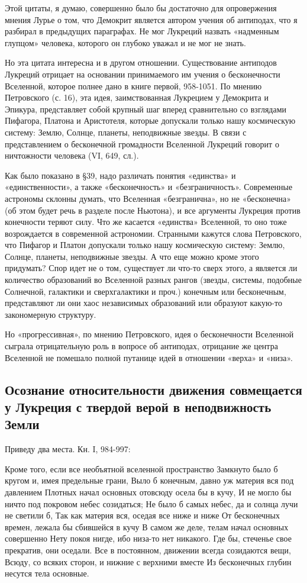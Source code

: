 Этой цитаты, я думаю, совершенно было бы достаточно для опровержения
мнения Лурье о том, что Демокрит является автором учения об антиподах,
что я разбирал в предыдущих параграфах. Не мог Лукреций назвать
«надменным глупцом» человека, которого он глубоко уважал и не мог не
знать.

Но эта цитата интересна и в другом отношении. Существование антиподов
Лукреций отрицает на основании принимаемого им учения о бесконечности
Вселенной, которое полнее дано в книге первой, 958-1051. По мнению
Петровского (с. 16), эта идея, заимствованная Лукрецием у Демокрита и
Эпикура, представляет собой крупный шаг вперед сравнительно со
взглядами Пифагора, Платона и Аристотеля, которые допускали только
нашу космическую систему: Землю, Солнце, планеты, неподвижные звезды.
В связи с представлением о бесконечной громадности Вселенной Лукреций
говорит о ничтожности человека (VI, 649, сл.).

Как было показано в §39, надо различать понятия «единства» и
«единственности», а также «бесконечность» и «безграничность».
Современные астрономы склонны думать, что Вселенная «безгранична», но
не «бесконечна» (об этом будет речь в разделе после Ньютона), и все
аргументы Лукреция против конечности теряют силу. Что же касается
«единства» Вселенной, то оно тоже возрождается в современной
астрономии. Странными кажутся слова Петровского, что Пифагор и Платон
допускали только нашу космическую систему: Землю, Солнце, планеты,
неподвижные звезды. А что еще можно кроме этого придумать? Спор идет
не о том, существует ли что-то сверх этого, а является ли количество
образований во Вселенной разных рангов (звезды, системы, подобные
Солнечной, галактики и сверхгалактики и проч.) конечным или
бесконечным, представляют ли они хаос независимых образований или
образуют какую-то закономерную структуру.

Но «прогрессивная», по мнению Петровского, идея о бесконечности
Вселенной сыграла отрицательную роль в вопросе об антиподах, отрицание
же центра Вселенной не помешало полной путанице идей в отношении
«верха» и «низа».

\subsection{Осознание относительности движения совмещается у Лукреция
с твердой верой в неподвижность Земли}

Приведу два места. Кн. I, 984-997:

Кроме того, если все необъятной вселенной пространство Замкнуто было б
кругом и, имея предельные грани, Выло б конечным, давно уж материя вся
под давлением Плотных начал основных отовсюду осела бы в кучу, И не
могло бы ничто под покровом небес созидаться; Не было б самых небес,
да и солнца лучи не светили б, Так как материя вся, оседая все ниже и
ниже От бесконечных времен, лежала бы сбившейся в кучу В самом же
деле, телам начал основных совершенно Нету покоя нигде, ибо низа-то
нет никакого. Где бы, стеченье свое прекратив, они оседали. Все в
постоянном, движении всегда созидаются вещи, Всюду, со всяких сторон,
и нижние с верхними вместе Из бесконечных глубин несутся тела
основные.


